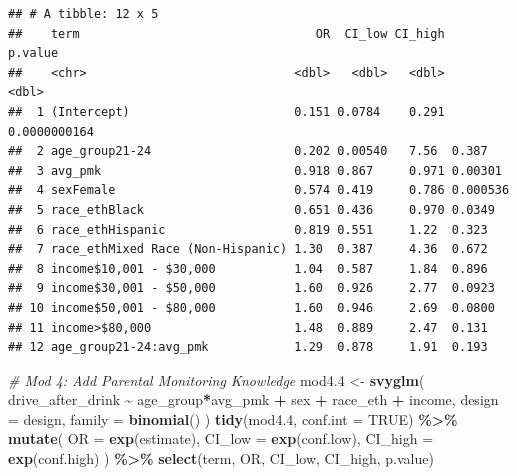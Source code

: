 \documentclass[
]{article}
\newenvironment{Shaded}{\begin{snugshade}}{\end{snugshade}}
\newcommand{\AttributeTok}[1]{\textcolor[rgb]{0.13,0.29,0.53}{#1}}
\newcommand{\CommentTok}[1]{\textcolor[rgb]{0.56,0.35,0.01}{\textit{#1}}}
\newcommand{\ConstantTok}[1]{\textcolor[rgb]{0.56,0.35,0.01}{#1}}
\newcommand{\FloatTok}[1]{\textcolor[rgb]{0.00,0.00,0.81}{#1}}
\newcommand{\FunctionTok}[1]{\textcolor[rgb]{0.13,0.29,0.53}{\textbf{#1}}}
\newcommand{\NormalTok}[1]{#1}
\newcommand{\OtherTok}[1]{\textcolor[rgb]{0.56,0.35,0.01}{#1}}
\newcommand{\SpecialCharTok}[1]{\textcolor[rgb]{0.81,0.36,0.00}{\textbf{#1}}}
\begin{document}
\begin{verbatim}
## # A tibble: 12 x 5
##    term                                 OR  CI_low CI_high      p.value
##    <chr>                             <dbl>   <dbl>   <dbl>        <dbl>
##  1 (Intercept)                       0.151 0.0784    0.291 0.0000000164
##  2 age_group21-24                    0.202 0.00540   7.56  0.387       
##  3 avg_pmk                           0.918 0.867     0.971 0.00301     
##  4 sexFemale                         0.574 0.419     0.786 0.000536    
##  5 race_ethBlack                     0.651 0.436     0.970 0.0349      
##  6 race_ethHispanic                  0.819 0.551     1.22  0.323       
##  7 race_ethMixed Race (Non-Hispanic) 1.30  0.387     4.36  0.672       
##  8 income$10,001 - $30,000           1.04  0.587     1.84  0.896       
##  9 income$30,001 - $50,000           1.60  0.926     2.77  0.0923      
## 10 income$50,001 - $80,000           1.60  0.946     2.69  0.0800      
## 11 income>$80,000                    1.48  0.889     2.47  0.131       
## 12 age_group21-24:avg_pmk            1.29  0.878     1.91  0.193
\end{verbatim}

\begin{Shaded}
\begin{Highlighting}[]
\CommentTok{\# Mod 4: Add Parental Monitoring Knowledge }
\NormalTok{mod4}\FloatTok{.4} \OtherTok{\textless{}{-}} \FunctionTok{svyglm}\NormalTok{(}
\NormalTok{  drive\_after\_drink }\SpecialCharTok{\textasciitilde{}}\NormalTok{ age\_group}\SpecialCharTok{*}\NormalTok{avg\_pmk }\SpecialCharTok{+}\NormalTok{ sex }\SpecialCharTok{+}\NormalTok{ race\_eth }\SpecialCharTok{+}\NormalTok{ income,}
  \AttributeTok{design =}\NormalTok{ design,}
  \AttributeTok{family =} \FunctionTok{binomial}\NormalTok{()}
\NormalTok{)  }
\FunctionTok{tidy}\NormalTok{(mod4}\FloatTok{.4}\NormalTok{, }\AttributeTok{conf.int =} \ConstantTok{TRUE}\NormalTok{) }\SpecialCharTok{\%\textgreater{}\%}
  \FunctionTok{mutate}\NormalTok{(}
    \AttributeTok{OR =} \FunctionTok{exp}\NormalTok{(estimate),}
    \AttributeTok{CI\_low =} \FunctionTok{exp}\NormalTok{(conf.low),}
    \AttributeTok{CI\_high =} \FunctionTok{exp}\NormalTok{(conf.high)}
\NormalTok{  ) }\SpecialCharTok{\%\textgreater{}\%}
  \FunctionTok{select}\NormalTok{(term, OR, CI\_low, CI\_high, p.value)}
\end{Highlighting}
\end{Shaded}
\end{document}
